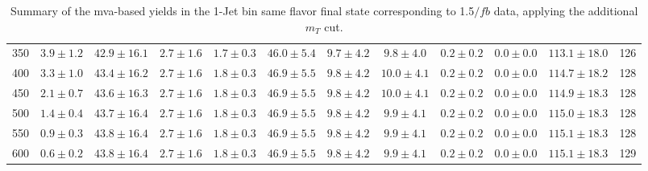 \begin{table}
{\begin{center}
\begin{tabular}{l c c c c c c c c c c c }
350 & $3.9\pm1.2$ & $42.9\pm16.1$ & $2.7\pm1.6$ & $1.7\pm0.3$ & $46.0\pm5.4$ & $9.7\pm4.2$ & $9.8\pm4.0$ & $0.2\pm0.2$ & $0.0\pm0.0$ & $113.1\pm18.0$ & 126 \\
400 & $3.3\pm1.0$ & $43.4\pm16.2$ & $2.7\pm1.6$ & $1.8\pm0.3$ & $46.9\pm5.5$ & $9.8\pm4.2$ & $10.0\pm4.1$ & $0.2\pm0.2$ & $0.0\pm0.0$ & $114.7\pm18.2$ & 128 \\
450 & $2.1\pm0.7$ & $43.6\pm16.3$ & $2.7\pm1.6$ & $1.8\pm0.3$ & $46.9\pm5.5$ & $9.8\pm4.2$ & $10.0\pm4.1$ & $0.2\pm0.2$ & $0.0\pm0.0$ & $114.9\pm18.3$ & 128 \\
500 & $1.4\pm0.4$ & $43.7\pm16.4$ & $2.7\pm1.6$ & $1.8\pm0.3$ & $46.9\pm5.5$ & $9.8\pm4.2$ & $9.9\pm4.1$ & $0.2\pm0.2$ & $0.0\pm0.0$ & $115.0\pm18.3$ & 128 \\
550 & $0.9\pm0.3$ & $43.8\pm16.4$ & $2.7\pm1.6$ & $1.8\pm0.3$ & $46.9\pm5.5$ & $9.8\pm4.2$ & $9.9\pm4.1$ & $0.2\pm0.2$ & $0.0\pm0.0$ & $115.1\pm18.3$ & 128 \\
600 & $0.6\pm0.2$ & $43.8\pm16.4$ & $2.7\pm1.6$ & $1.8\pm0.3$ & $46.9\pm5.5$ & $9.8\pm4.2$ & $9.9\pm4.1$ & $0.2\pm0.2$ & $0.0\pm0.0$ & $115.1\pm18.3$ & 129 \\
\hline
\end{tabular}
\end{center}
}
\caption{Summary of the mva-based yields in the 1-Jet bin same flavor final state corresponding to 1.5$/fb$ data, applying the additional $m_T$ cut.}
\end{table}


